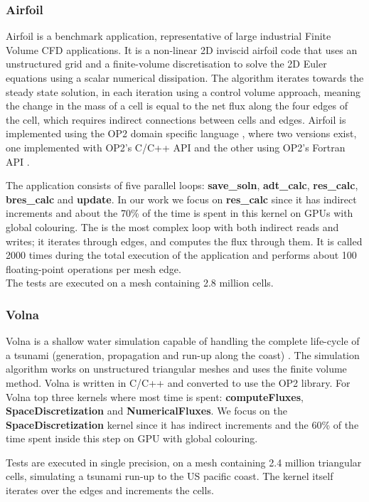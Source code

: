 \subsubsection{Airfoil}
Airfoil is a benchmark application, representative of
large industrial Finite Volume CFD applications. It is a non-linear 2D inviscid
airfoil code that uses an unstructured grid and a finite-volume discretisation
to solve the 2D Euler equations using a scalar numerical dissipation. The
algorithm iterates towards the steady state solution, in each iteration using a
control volume approach, meaning the change in the mass of a cell is equal to
the net flux along the four edges of the cell, which requires indirect
connections between cells and edges. Airfoil is implemented using the OP2 domain
specific language \cite{op2}, where two versions exist, one implemented with
OP2's C/C++ API and the other using OP2's Fortran API
\cite{giles2012op2,op2-repo}.

The application consists of five parallel loops: \textbf{save\_soln},
\textbf{adt\_calc}, \textbf{res\_calc}, \textbf{bres\_calc} and \textbf{update}.
In our work we focus on \textbf{res\_calc} since it has indirect increments and
about the 70\% of the time is spent in this kernel on GPUs with global
colouring.  The is the most complex loop with both indirect reads and writes; it
iterates through edges, and computes the flux through them. It is called 2000
times during the total execution of the application and performs about 100
floating-point operations per mesh edge.
\\
 The tests are executed on a mesh containing 2.8 million cells.

\subsubsection{Volna}
Volna is a shallow water simulation capable of handling the complete life-cycle
of a tsunami (generation, propagation and run-up along the coast)
\cite{dutykh2011volna}. The simulation algorithm works on unstructured
triangular meshes and uses the finite volume method. Volna is written in C/C++
and converted to use the OP2 library\cite{op2}. For Volna top three kernels
where most time is spent: \textbf{computeFluxes}, \textbf{SpaceDiscretization}
and \textbf{NumericalFluxes}. We focus on the \textbf{SpaceDiscretization}
kernel since it has indirect increments and the 60\% of the time spent inside
this step on GPU with global colouring. 

Tests are executed in single precision, on a mesh containing 2.4 million
triangular cells, simulating a tsunami run-up to the US pacific coast. The
kernel itself iterates over the edges and increments the cells.

